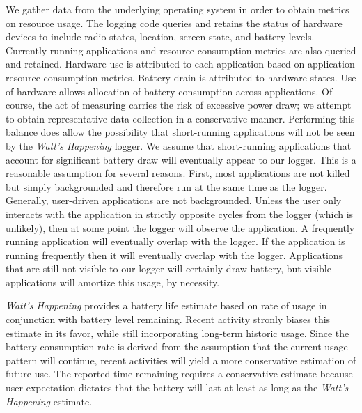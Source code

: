 We gather data from the underlying operating system in order to obtain metrics on resource usage.
The logging code queries and retains the status of hardware devices to include radio states, location, screen state, and battery levels.
Currently running applications and resource consumption metrics are also queried and retained. 
Hardware use is attributed to each application based on application resource consumption metrics. 
Battery drain is attributed to hardware states.
Use of hardware allows allocation of battery consumption across applications.
Of course, the act of measuring carries the risk of excessive power draw; we attempt to obtain representative data collection in a conservative manner.
Performing this balance does allow the possibility that short-running applications will not be seen by the \emph{Watt's Happening} logger.
We assume that short-running applications that account for significant battery draw will eventually appear to our logger.
This is a reasonable assumption for several reasons.
First, most applications are not killed but simply backgrounded and therefore run at the same time as the logger.
Generally, user-driven applications are not backgrounded.
Unless the user only interacts with the application in strictly opposite cycles from the logger (which is unlikely), then at some point the logger will observe the application.
A frequently running application will eventually overlap with the logger.
If the application is running frequently then it will eventually overlap with the logger.
Applications that are still not visible to our logger will certainly draw battery, but visible applications will amortize this usage, by necessity.

\emph{Watt's Happening} provides a battery life estimate based on rate of usage in conjunction with battery level remaining.
Recent activity stronly biases this estimate in its favor, while still incorporating long-term historic usage.
Since the battery consumption rate is derived from the assumption that the current usage pattern will continue, recent activities will yield a more conservative estimation of future use.
The reported time remaining requires a conservative estimate because user expectation dictates that the battery will last at least as long as the \emph{Watt's Happening} estimate.


